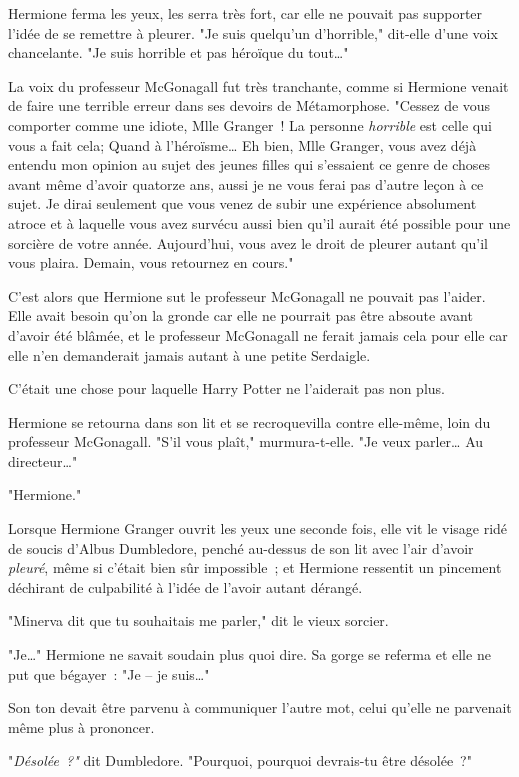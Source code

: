 Hermione ferma les yeux, les serra très fort, car elle ne pouvait pas supporter l'idée de se remettre à pleurer. "Je suis quelqu'un d'horrible," dit-elle d'une voix chancelante. "Je suis horrible et pas héroïque du tout…"

La voix du professeur McGonagall fut très tranchante, comme si Hermione venait de faire une terrible erreur dans ses devoirs de Métamorphose. "Cessez de vous comporter comme une idiote, Mlle Granger~! La personne \emph{horrible} est celle qui vous a fait cela; Quand à l'héroïsme… Eh bien, Mlle Granger, vous avez déjà entendu mon opinion au sujet des jeunes filles qui s'essaient ce genre de choses avant même d'avoir quatorze ans, aussi je ne vous ferai pas d'autre leçon à ce sujet. Je dirai seulement que vous venez de subir une expérience absolument atroce et à laquelle vous avez survécu aussi bien qu'il aurait été possible pour une sorcière de votre année. Aujourd'hui, vous avez le droit de pleurer autant qu'il vous plaira. Demain, vous retournez en cours."

C'est alors que Hermione sut le professeur McGonagall ne pouvait pas l'aider. Elle avait besoin qu'on la gronde car elle ne pourrait pas être absoute avant d'avoir été blâmée, et le professeur McGonagall ne ferait jamais cela pour elle car elle n'en demanderait jamais autant à une petite Serdaigle.

C'était une chose pour laquelle Harry Potter ne l'aiderait pas non plus.

Hermione se retourna dans son lit et se recroquevilla contre elle-même, loin du professeur McGonagall. "S'il vous plaît," murmura-t-elle. "Je veux parler… Au directeur…"

\later

"Hermione."

Lorsque Hermione Granger ouvrit les yeux une seconde fois, elle vit le visage ridé de soucis d'Albus Dumbledore, penché au-dessus de son lit avec l'air d'avoir \emph{pleuré}, même si c'était bien sûr impossible~; et Hermione ressentit un pincement déchirant de culpabilité à l'idée de l'avoir autant dérangé.

"Minerva dit que tu souhaitais me parler," dit le vieux sorcier.

"Je…" Hermione ne savait soudain plus quoi dire. Sa gorge se referma et elle ne put que bégayer~: "Je -- je suis…"

Son ton devait être parvenu à communiquer l'autre mot, celui qu'elle ne parvenait même plus à prononcer.

"\emph{Désolée~?"} dit Dumbledore. "Pourquoi, pourquoi devrais-tu être désolée~?"

